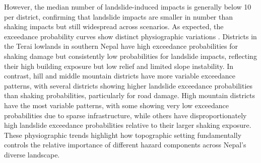 \documentclass[nhess, manuscript]{copernicus}
\begin{document}
However, the median number of landslide-induced impacts is generally below 10 per district, confirming that landslide impacts are smaller in number than shaking impacts but still widespread across scenarios. As expected, the exceedance probability curves show distinct physiographic variations \citep{upreti_physiography_2001}. Districts in the Terai lowlands in southern Nepal have high exceedance probabilities for shaking damage but consistently low probabilities for landslide impacts, reflecting their high building exposure but low relief and limited slope instability. In contrast, hill and middle mountain districts have more variable exceedance patterns, with several districts showing higher landslide exceedance probabilities than shaking probabilities, particularly for road damage. High mountain districts have the most variable patterns, with some showing very low exceedance probabilities due to sparse infrastructure, while others have disproportionately high landslide exceedance probabilities relative to their larger shaking exposure. These physiographic trends highlight how topographic setting fundamentally controls the relative importance of different hazard components across Nepal's diverse landscape.
\end{document}
